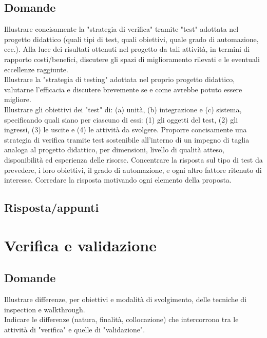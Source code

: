 \subsection*{Domande}
Illustrare concisamente la "strategia di verifica" tramite "test" adottata nel progetto didattico (quali tipi di test, quali obiettivi, quale grado di automazione, ecc.). 
Alla luce dei risultati ottenuti nel progetto da tali attività, in termini di rapporto costi/benefici, discutere gli spazi di miglioramento rilevati e le eventuali eccellenze raggiunte.\\

Illustrare la "strategia di testing" adottata nel proprio progetto didattico, valutarne l'efficacia e discutere brevemente se e come avrebbe potuto essere migliore.\\

Illustrare gli obiettivi dei "test" di: (a) unità, (b) integrazione e (c) sistema, specificando quali siano per ciascuno di essi: (1) gli oggetti del test, (2) gli ingressi, (3) le uscite e (4) le attività da svolgere.
Proporre concisamente una strategia di verifica tramite test sostenibile all'interno di un impegno di taglia analoga al progetto didattico, per dimensioni, livello di qualità atteso, disponibilità ed esperienza delle risorse.
Concentrare la risposta sul tipo di test da prevedere, i loro obiettivi, il grado di automazione, e ogni altro fattore ritenuto di interesse. 
Corredare la risposta motivando ogni elemento della proposta.

\subsection*{Risposta/appunti}

\section{Verifica e validazione}

\subsection*{Domande}

Illustrare differenze, per obiettivi e modalità di svolgimento, delle tecniche di inspection e walkthrough.\\

Indicare le differenze (natura, finalità, collocazione) che intercorrono tra le attività di "verifica" e quelle di "validazione".\\

